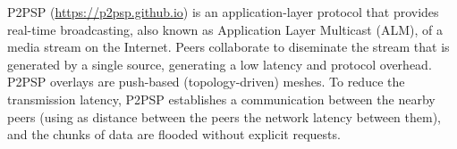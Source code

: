 P2PSP (\url{https://p2psp.github.io}) is an application-layer protocol
that provides real-time broadcasting, also known as Application Layer
Multicast (ALM), of a media stream on the Internet. Peers collaborate
to diseminate the stream that is generated by a single source,
generating a low latency and protocol overhead. P2PSP overlays are
push-based (topology-driven) meshes. To reduce the transmission
latency, P2PSP establishes a communication between the nearby peers
(using as distance between the peers the network latency between
them), and the chunks of data are flooded without explicit
requests.

